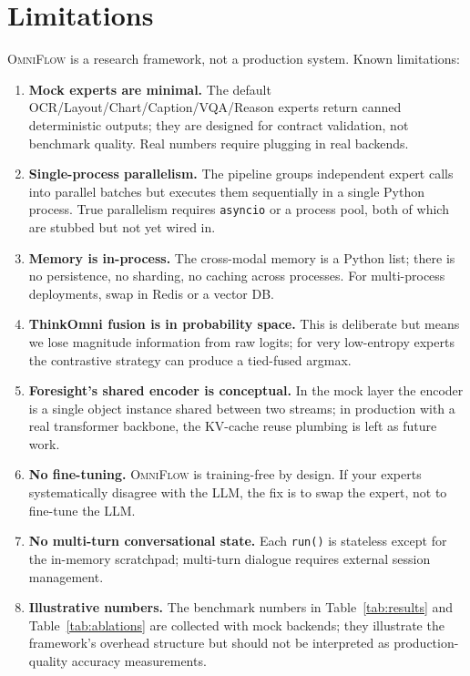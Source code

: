 \documentclass[11pt,a4paper]{article}
\newcommand{\OmniFlow}{\textsc{OmniFlow}}
\begin{document}
\section{Limitations}\label{sec:limitations}

\OmniFlow{} is a research framework, not a production system. Known
limitations:

\begin{enumerate}[leftmargin=*]
  \item \textbf{Mock experts are minimal.} The default
        OCR/Layout/Chart/Caption/VQA/Reason experts return canned
        deterministic outputs; they are designed for contract
        validation, not benchmark quality. Real numbers require
        plugging in real backends.
  \item \textbf{Single-process parallelism.} The pipeline groups
        independent expert calls into parallel batches but executes
        them sequentially in a single Python process. True parallelism
        requires \texttt{asyncio} or a process pool, both of which are
        stubbed but not yet wired in.
  \item \textbf{Memory is in-process.} The cross-modal memory is a
        Python list; there is no persistence, no sharding, no caching
        across processes. For multi-process deployments, swap in Redis
        or a vector DB.
  \item \textbf{ThinkOmni fusion is in probability space.} This is
        deliberate but means we lose magnitude information from raw
        logits; for very low-entropy experts the contrastive strategy
        can produce a tied-fused argmax.
  \item \textbf{Foresight's shared encoder is conceptual.} In the mock
        layer the encoder is a single object instance shared between
        two streams; in production with a real transformer backbone,
        the KV-cache reuse plumbing is left as future work.
  \item \textbf{No fine-tuning.} \OmniFlow{} is training-free by design.
        If your experts systematically disagree with the LLM, the fix
        is to swap the expert, not to fine-tune the LLM.
  \item \textbf{No multi-turn conversational state.} Each
        \texttt{run()} is stateless except for the in-memory scratchpad;
        multi-turn dialogue requires external session management.
  \item \textbf{Illustrative numbers.} The benchmark numbers in
        Table~\ref{tab:results} and Table~\ref{tab:ablations} are
        collected with mock backends; they illustrate the framework's
        overhead structure but should not be interpreted as
        production-quality accuracy measurements.
\end{enumerate}
\end{document}
